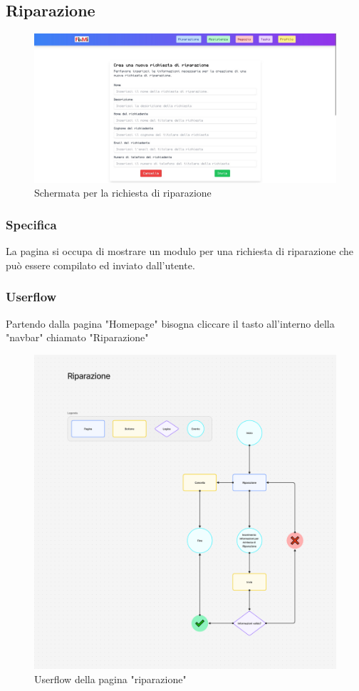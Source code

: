 \documentclass{report}
\begin{document}
\subsection{Riparazione}

\begin{figure}[H]
	\centering\includegraphics[width=1\textwidth]{images/microservizio-home/frontend/riparazione.jpg}
	\caption{Schermata per la richiesta di riparazione}
\end{figure}
\subsubsection*{Specifica}
La pagina si occupa di mostrare un modulo per una richiesta di riparazione che può essere compilato ed inviato dall'utente.\\ 

\subsubsection*{Userflow}
Partendo dalla pagina "Homepage" bisogna cliccare il tasto all'interno della "navbar" chiamato "Riparazione"
\begin{figure}[H]
	\centering\includegraphics[width=1\textwidth]{images/microservizio-home/frontend/riparazione-userflow.png}
	Userflow della pagina "riparazione"
\end{figure}
\end{document}
